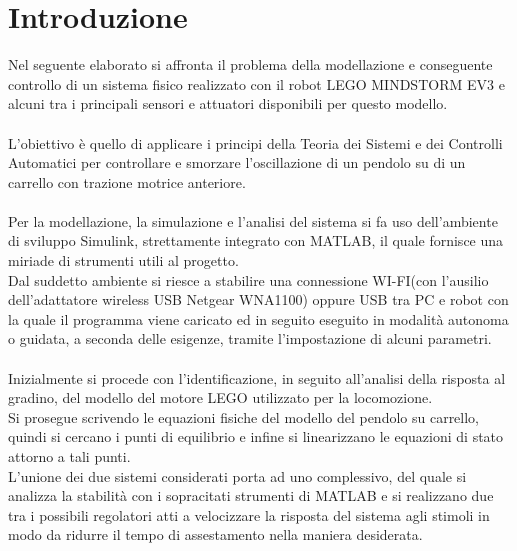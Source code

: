 \chapter{Introduzione}
Nel seguente elaborato si affronta il problema della modellazione e conseguente controllo di un sistema fisico realizzato con il robot LEGO MINDSTORM EV3 e alcuni tra i principali sensori e attuatori disponibili per questo modello.\\\\
L'obiettivo è quello di applicare i principi della Teoria dei Sistemi e dei Controlli Automatici per controllare e smorzare l'oscillazione di un pendolo su di un carrello con trazione motrice anteriore.\\\\
Per la modellazione, la simulazione e l'analisi del sistema si fa uso dell'ambiente di sviluppo Simulink, strettamente integrato con MATLAB, il quale fornisce una miriade di strumenti utili al progetto.\\
Dal suddetto ambiente si riesce a stabilire una connessione WI-FI(con l'ausilio dell'adattatore wireless USB Netgear WNA1100) oppure USB tra PC e robot con la quale il programma viene caricato ed in seguito eseguito in modalità autonoma o guidata, a seconda delle esigenze, tramite l'impostazione di alcuni parametri.\\\\
Inizialmente si procede con l'identificazione, in seguito all'analisi della risposta al gradino, del modello del motore LEGO utilizzato per la locomozione.\\
Si prosegue scrivendo le equazioni fisiche del modello del pendolo su carrello, quindi si cercano i punti di equilibrio e  infine si linearizzano le equazioni di stato attorno a tali punti.\\
L'unione dei due sistemi considerati porta ad uno complessivo, del quale si analizza la stabilità con i sopracitati strumenti di MATLAB e si realizzano due tra i possibili regolatori atti a velocizzare la risposta del sistema agli stimoli in modo da ridurre il tempo di assestamento nella maniera desiderata.\\



